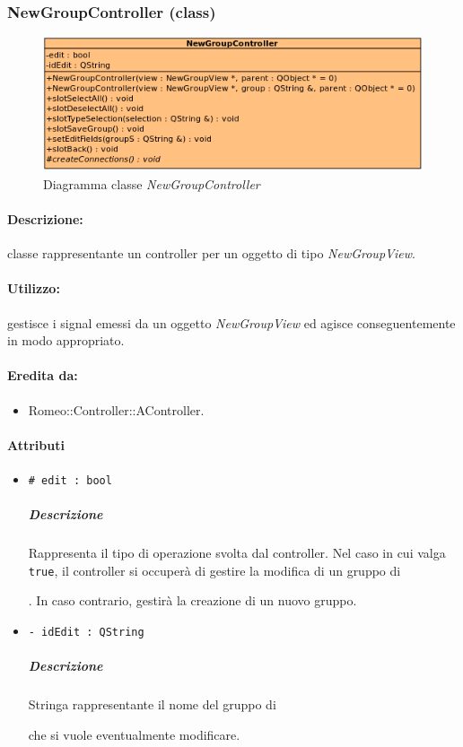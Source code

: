 	\subsubsection{NewGroupController (class)}
	\begin{figure}[!h]
		\centering
		\includegraphics[scale=2.75]{./Content/Immagini/controller/NewGroupController}
		\caption{Diagramma classe \textsl{NewGroupController}}
	\end{figure}
	\paragraph{Descrizione:} classe rappresentante un controller per un oggetto di tipo \textsl{NewGroupView}.
	\paragraph{Utilizzo:} gestisce i signal\g{} emessi da un oggetto \textsl{NewGroupView} ed agisce conseguentemente in modo appropriato.
	\paragraph{Eredita da:}
		\begin{itemize}
			\item Romeo::Controller::AController.
		\end{itemize}
	\paragraph{Attributi}
		\begin{itemize}
			\item \color{teal} \verb!# edit : bool!
			\color{black}
			\subparagraph{Descrizione} Rappresenta il tipo di operazione svolta dal controller. Nel caso in cui valga \verb!true!, il controller si occuperà di gestire la modifica di un gruppo di \subject{}. In caso contrario, gestirà la creazione di un nuovo gruppo.
			\item \color{teal} \verb!- idEdit : QString!
			\color{black}
			\subparagraph{Descrizione} Stringa rappresentante il nome del gruppo di \subject{} che si vuole eventualmente modificare.
		\end{itemize}
